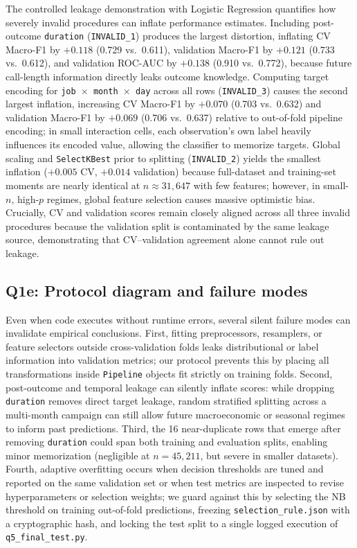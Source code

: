 The controlled leakage demonstration with Logistic Regression quantifies how severely invalid procedures can inflate performance estimates. Including post-outcome \texttt{duration} (\texttt{INVALID\_1}) produces the largest distortion, inflating CV Macro-F1 by $+0.118$ (0.729 vs.\ 0.611), validation Macro-F1 by $+0.121$ (0.733 vs.\ 0.612), and validation ROC-AUC by $+0.138$ (0.910 vs.\ 0.772), because future call-length information directly leaks outcome knowledge. Computing target encoding for \texttt{job $\times$ month $\times$ day} across all rows (\texttt{INVALID\_3}) causes the second largest inflation, increasing CV Macro-F1 by $+0.070$ (0.703 vs.\ 0.632) and validation Macro-F1 by $+0.069$ (0.706 vs.\ 0.637) relative to out-of-fold pipeline encoding; in small interaction cells, each observation's own label heavily influences its encoded value, allowing the classifier to memorize targets. Global scaling and \texttt{SelectKBest} prior to splitting (\texttt{INVALID\_2}) yields the smallest inflation ($+0.005$ CV, $+0.014$ validation) because full-dataset and training-set moments are nearly identical at $n \approx 31{,}647$ with few features; however, in small-$n$, high-$p$ regimes, global feature selection causes massive optimistic bias. Crucially, CV and validation scores remain closely aligned across all three invalid procedures because the validation split is contaminated by the same leakage source, demonstrating that CV--validation agreement alone cannot rule out leakage.

\subsection{Q1e: Protocol diagram and failure modes}

Even when code executes without runtime errors, several silent failure modes can invalidate empirical conclusions. First, fitting preprocessors, resamplers, or feature selectors outside cross-validation folds leaks distributional or label information into validation metrics; our protocol prevents this by placing all transformations inside \texttt{Pipeline} objects fit strictly on training folds. Second, post-outcome and temporal leakage can silently inflate scores: while dropping \texttt{duration} removes direct target leakage, random stratified splitting across a multi-month campaign can still allow future macroeconomic or seasonal regimes to inform past predictions. Third, the 16 near-duplicate rows that emerge after removing \texttt{duration} could span both training and evaluation splits, enabling minor memorization (negligible at $n = 45{,}211$, but severe in smaller datasets). Fourth, adaptive overfitting occurs when decision thresholds are tuned and reported on the same validation set or when test metrics are inspected to revise hyperparameters or selection weights; we guard against this by selecting the NB threshold on training out-of-fold predictions, freezing \texttt{selection\_rule.json} with a cryptographic hash, and locking the test split to a single logged execution of \texttt{q5\_final\_test.py}.
